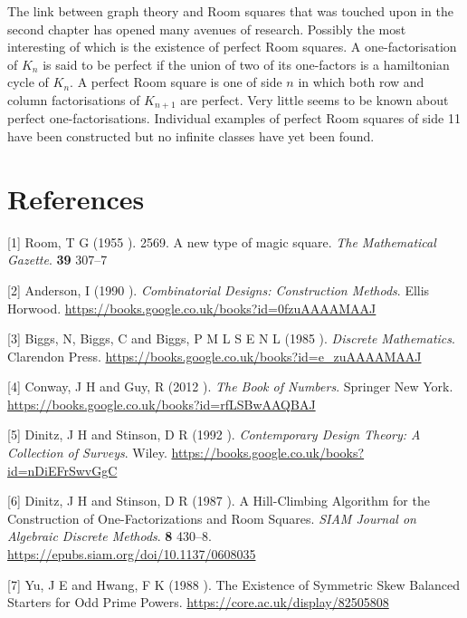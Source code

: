 \documentclass[
  12pt,
  a4paper]{book}
\begin{document}
The link between graph theory and Room squares that was touched upon in
the second chapter has opened many avenues of research. Possibly the
most interesting of which is the existence of perfect Room squares. A
one-factorisation of \(K_n\) is said to be perfect if the union of two of
its one-factors is a hamiltonian cycle of \(K_n\). A perfect Room square
is one of side \(n\) in which both row and column factorisations of
\(K_{n+1}\) are perfect. Very little seems to be known about perfect
one-factorisations. Individual examples of perfect Room squares of side
11 have been constructed but no infinite classes have yet been found.

\hypertarget{references}{%
\chapter*{References}\label{references}}

\hypertarget{refs}{}
\leavevmode\hypertarget{ref-room_2569_1955}{}%
{[}1{]} Room, T G (1955 ). 2569. A new type of magic square. \emph{The Mathematical Gazette}. \textbf{39} 307--7

\leavevmode\hypertarget{ref-anderson_combinatorial_1990}{}%
{[}2{]} Anderson, I (1990 ). \emph{Combinatorial Designs: Construction Methods}. Ellis Horwood. \url{https://books.google.co.uk/books?id=0fzuAAAAMAAJ}

\leavevmode\hypertarget{ref-biggs_discrete_1985}{}%
{[}3{]} Biggs, N, Biggs, C and Biggs, P M L S E N L (1985 ). \emph{Discrete Mathematics}. Clarendon Press. \url{https://books.google.co.uk/books?id=e_zuAAAAMAAJ}

\leavevmode\hypertarget{ref-conway_book_2012}{}%
{[}4{]} Conway, J H and Guy, R (2012 ). \emph{The Book of Numbers}. Springer New York. \url{https://books.google.co.uk/books?id=rfLSBwAAQBAJ}

\leavevmode\hypertarget{ref-dinitz_contemporary_1992}{}%
{[}5{]} Dinitz, J H and Stinson, D R (1992 ). \emph{Contemporary Design Theory: A Collection of Surveys}. Wiley. \url{https://books.google.co.uk/books?id=nDiEFrSwvGgC}

\leavevmode\hypertarget{ref-dinitz_hill-climbing_1987}{}%
{[}6{]} Dinitz, J H and Stinson, D R (1987 ). A Hill-Climbing Algorithm for the Construction of One-Factorizations and Room Squares. \emph{SIAM Journal on Algebraic Discrete Methods}. \textbf{8} 430--8. \url{https://epubs.siam.org/doi/10.1137/0608035}

\leavevmode\hypertarget{ref-yu_existence_1988}{}%
{[}7{]} Yu, J E and Hwang, F K (1988 ). The Existence of Symmetric Skew Balanced Starters for Odd Prime Powers. \url{https://core.ac.uk/display/82505808}
\end{document}
